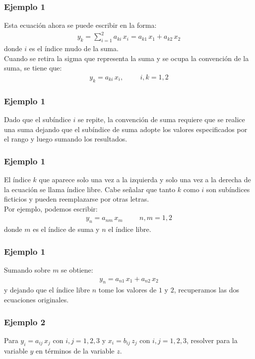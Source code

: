 \documentclass[12pt]{beamer}
\begin{document}
\begin{frame}
\frametitle{Ejemplo 1}
Esta ecuación ahora se puede escribir en la forma:
\begin{align*}
y_{k} = \sum_{i=1}^{2} a_{ki} \, x_{i} = a_{k1} \, x_{1} + a_{k2} \, x_{2}
\end{align*}
donde $i$ es el índice mudo de la suma.
\\
\bigskip
\pause
Cuando se retira la sigma que representa la suma y se ocupa la convención de la suma, se tiene que:
\begin{align*}
y_{k} = a_{ki} \, x_{i} , \hspace{1cm} i, k = 1, 2
\end{align*}
\end{frame}
\begin{frame}
\frametitle{Ejemplo 1}
Dado que el subíndice $i$ se repite, la convención de suma requiere que se realice una suma dejando que el subíndice de suma adopte los valores especificados por el rango y luego sumando los resultados. 
\end{frame}
\begin{frame}
\frametitle{Ejemplo 1}
El índice $k$ que aparece solo una vez a la izquierda y solo una vez a la derecha de la ecuación se llama índice libre. Cabe señalar que tanto $k$ como $i$ son subíndices ficticios y pueden reemplazarse por otras letras.
\\
\bigskip
\pause
Por ejemplo, podemos escribir:
\begin{align*}
y_{n} = a_{nm} \, x_{m} \hspace{1cm} n, m = 1, 2
\end{align*}
donde $m$ es el índice de suma y $n$ el índice libre.
\end{frame}
\begin{frame}
\frametitle{Ejemplo 1}
Sumando sobre $m$ se obtiene:
\begin{align*}
y_{n} = a_{n1} \, x_{1} + a_{n2} \, x_{2}
\end{align*}
y dejando que el índice libre $n$ tome los valores de $1$ y $2$, recuperamos las dos ecuaciones originales.
\end{frame}
\begin{frame}
\frametitle{Ejemplo 2}
Para $y_{i} = a_{ij} \, x_{j}$ con $i, j = 1, 2, 3$ y $x_{i} = b_{ij} \, z_{j}$ con $i, j = 1, 2, 3$, resolver para la variable $y$ en términos de la variable $z$.
\end{frame}
\end{document}
